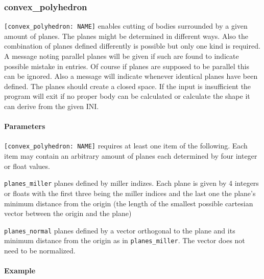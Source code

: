 \subsubsection{convex\_polyhedron}

\lstinline{[convex_polyhedron: NAME]} enables cutting of bodies surrounded by a given amount of planes. The planes might be determined in different ways. Also the combination of planes defined differently is possible but only one kind is required. A message noting parallel planes will be given if such are found to indicate possible mistake in entries. Of course if planes are supposed to be parallel this can be ignored. Also a message will indicate whenever identical planes have been defined. The planes should create a closed space. If the input is insufficient the program will exit if no proper body can be calculated or calculate the shape it can derive from the given INI.

\paragraph{Parameters}
\lstinline{[convex_polyhedron: NAME]} requires at least one item of the following. Each item may contain an arbitrary amount of planes each determined by four integer or float values.
\begin{description}
 \item{\lstinline{planes_miller}} planes defined by miller indizes. Each plane is given by 4 integers or floats with the first three being the miller indices and the last one the plane's minimum distance from the origin (the length of the smallest possible cartesian vector between the origin and the plane)
 \item{\lstinline{planes_normal}} planes defined by a vector orthogonal to the plane and its minimum distance from the origin as in \lstinline{planes_miller}. The vector does not need to be normalized.
\end{description} 

\paragraph{Example}


